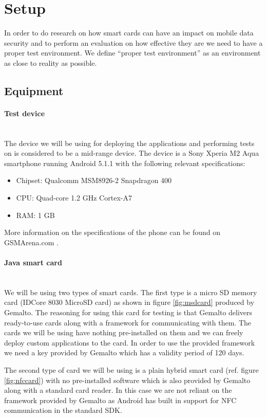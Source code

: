 \section{Setup}
In order to do research on how smart cards can have an impact on mobile data security and to perform an evaluation on how effective they are we need to have a proper test environment. We define ``proper test environment'' as an environment as close to reality as possible.
\subsection{Equipment}
\label{sec:equipment}

\paragraph{Test device}\mbox{}\\
The device we will be using for deploying the applications and performing tests on is considered to be a mid-range device. The device is a Sony Xperia M2 Aqua smartphone running Android 5.1.1 with the following relevant specifications:
\begin{itemize}
    \item Chipset: Qualcomm MSM8926-2 Snapdragon 400
    \item CPU: Quad-core 1.2 GHz Cortex-A7
    \item RAM: 1 GB
\end{itemize}
More information on the specifications of the phone can be found on  \newline
GSMArena.com \cite{sonym2}.

\paragraph{Java smart card}\mbox{}\\
We will be using two types of smart cards. The first type is a micro SD memory card (IDCore 8030 MicroSD card) as shown in figure \ref{fig:msdcard} produced by Gemalto. The reasoning for using this card for testing is that Gemalto delivers ready-to-use cards along with a framework for communicating with them. The cards we will be using have nothing pre-installed on them and we can freely deploy custom applications to the card. In order to use the provided framework we need a key provided by Gemalto which has a validity period of 120 days.

The second type of card we will be using is a plain hybrid smart card (ref. figure \ref{fig:nfccard}) with no pre-installed software which is also provided by Gemalto along with a standard card reader. In this case we are not reliant on the framework provided by Gemalto as Android has built in support for NFC communication in the standard SDK.

